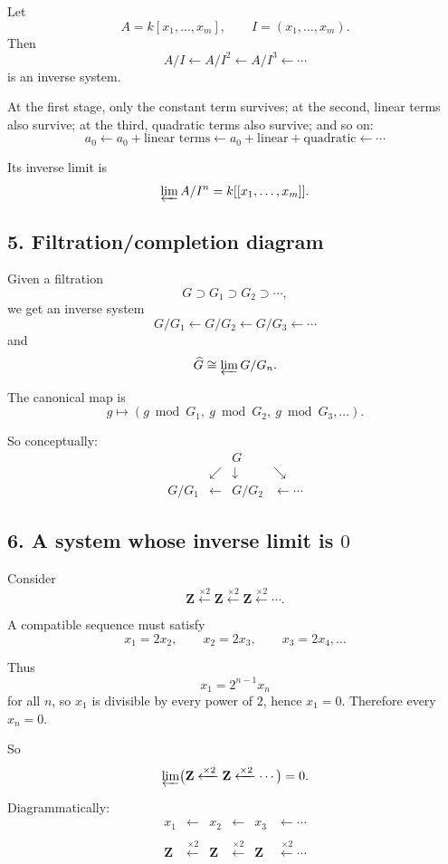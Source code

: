 \documentclass[12pt,a4paper]{article}
\theoremstyle{plain}
\theoremstyle{definition}      %
\begin{document}
	Let
	\[
	A=k[x_1,\dots,x_m],\qquad I=(x_1,\dots,x_m).
	\]
	Then
	\[
	A/I \xleftarrow{} A/I^2 \xleftarrow{} A/I^3 \xleftarrow{}\cdots
	\]
	is an inverse system.
	
	At the first stage, only the constant term survives; at the second, linear terms also survive; at the third, quadratic terms also survive; and so on:
	\[
	a_0
	\leftarrow
	a_0+\text{linear terms}
	\leftarrow
	a_0+\text{linear}+\text{quadratic}
	\leftarrow \cdots
	\]
	
	Its inverse limit is
	\[
	\varprojlim A/I^n = k[[x_1,\dots,x_m]].
	\]
	
	\subsection*{5. Filtration/completion diagram}
	
	Given a filtration
	\[
	G\supset G_1\supset G_2\supset \cdots,
	\]
	we get an inverse system
	\[
	G/G_1 \xleftarrow{} G/G_2 \xleftarrow{} G/G_3 \xleftarrow{}\cdots
	\]
	and
	\[
	\widehat G \cong \varprojlim G/G_n.
	\]
	
	The canonical map is
	\[
	g\mapsto (g \bmod G_1,\ g \bmod G_2,\ g \bmod G_3,\dots).
	\]
	
	So conceptually:
	\[
	\begin{array}{cccccc}
		& & G \\
		& \swarrow & \downarrow & \searrow \\
		G/G_1 & \leftarrow & G/G_2 & \leftarrow \cdots
	\end{array}
	\]
	
	\subsection*{6. A system whose inverse limit is \(0\)}
	
	Consider
	\[
	\mathbf Z \xleftarrow{\times 2} \mathbf Z \xleftarrow{\times 2} \mathbf Z \xleftarrow{\times 2}\cdots.
	\]
	
	A compatible sequence must satisfy
	\[
	x_1=2x_2,\qquad x_2=2x_3,\qquad x_3=2x_4,\dots
	\]
	
	Thus
	\[
	x_1=2^{n-1}x_n
	\]
	for all \(n\), so \(x_1\) is divisible by every power of \(2\), hence \(x_1=0\). Therefore every \(x_n=0\).
	
	So
	\[
	\varprojlim\bigl(\mathbf Z \xleftarrow{\times2}\mathbf Z \xleftarrow{\times2}\cdots\bigr)=0.
	\]
	
	Diagrammatically:
	\[
	\begin{array}{cccccc}
		x_1 & \leftarrow & x_2 & \leftarrow & x_3 & \leftarrow \cdots \\
		&           &      &           &      & \\
		\mathbf Z & \xleftarrow{\times 2} & \mathbf Z & \xleftarrow{\times 2} & \mathbf Z & \xleftarrow{\times 2} \cdots
	\end{array}
	\]
	
\end{document}
